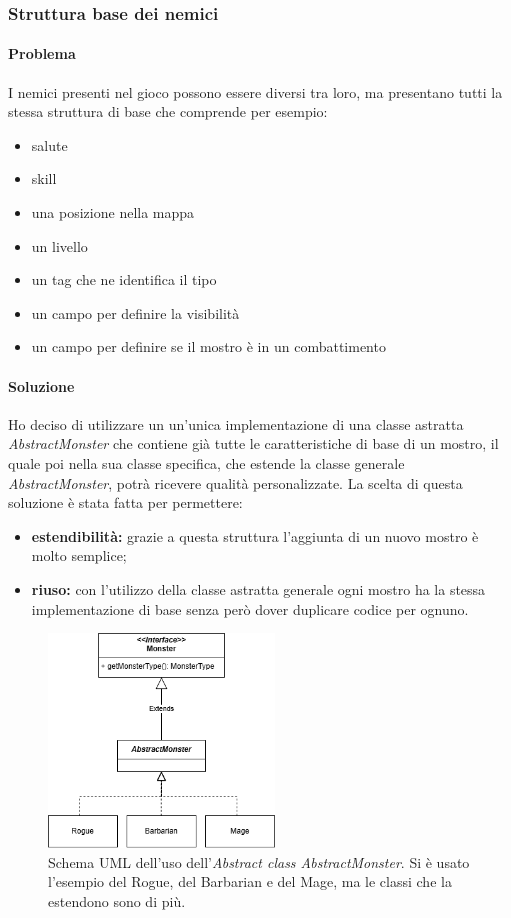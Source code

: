 \documentclass{report}
\begin{document}
\subsubsection{Struttura base dei nemici}

\paragraph{Problema} I nemici presenti nel gioco possono essere diversi tra loro, ma presentano tutti la stessa struttura di base che comprende per esempio:

\begin{itemize}
    \item salute
    \item skill
    \item una posizione nella mappa
    \item un livello
    \item un tag che ne identifica il tipo
    \item un campo per definire la visibilità
    \item un campo per definire se il mostro è in un combattimento
\end{itemize}

\paragraph{Soluzione} Ho deciso di utilizzare un un'unica implementazione di una classe astratta \textit{AbstractMonster} che contiene già tutte le caratteristiche di base di un mostro, il quale poi nella sua classe
%
specifica, che estende la classe generale \textit{AbstractMonster}, potrà ricevere qualità personalizzate. La scelta di questa soluzione è stata fatta per permettere:

\begin{itemize}
    \item \textbf{estendibilità:} grazie a questa struttura l'aggiunta di un nuovo mostro è molto semplice;
    \item \textbf{riuso:} con l'utilizzo della classe astratta generale ogni mostro ha la stessa implementazione di base senza però dover duplicare codice per ognuno.
\end{itemize}

\begin{figure}[H]
    \centering
    \includegraphics[width=6cm]{AbstractMonster.png}
    \caption{Schema UML dell'uso dell'\textit{Abstract class AbstractMonster}. Si è usato l'esempio del Rogue, del Barbarian e del Mage, ma le classi che la estendono sono di più.}
    \label{img:AbstractMonster}
\end{figure}
\end{document}
